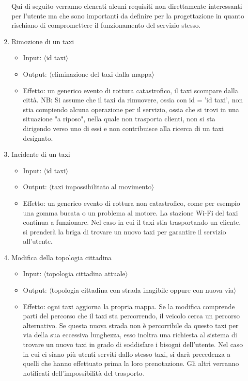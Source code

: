 \begin{enumerate}
	Qui di seguito verranno elencati alcuni requisiti non direttamente interessanti per l'utente ma che sono importanti da definire per la progettazione in quanto rischiano di compromettere il funzionamento del servizio stesso.
	
	\item Rimozione di un taxi
		\begin{itemize}
			\item Input: $\langle$id taxi$\rangle$
			\item Output: $\langle$eliminazione del taxi dalla mappa$\rangle$
			\item Effetto: un generico evento di rottura catastrofico, il taxi scompare dalla città. NB: Si assume che il taxi da rimuovere, ossia con id = 'id taxi', non stia compiendo alcuna operazione per il servizio, ossia che si trovi in una situazione "a riposo", nella quale non trasporta clienti, non si sta dirigendo verso uno di essi e non contribuisce alla ricerca di un taxi designato.
		\end{itemize}
	
	\item Incidente di un taxi
	\begin{itemize}
		\item Input: $\langle$id taxi$\rangle$
		\item Output: $\langle$taxi impossibilitato al movimento$\rangle$
		\item Effetto: un generico evento di rottura non catastrofico, come per esempio una gomma bucata o un problema al motore. La stazione Wi-Fi del taxi continua a funzionare. Nel caso in cui il taxi stia trasportando un cliente, si prenderà la briga di trovare un nuovo taxi per garantire il servizio all'utente.
	\end{itemize}

	\item Modifica della topologia cittadina
		\begin{itemize}
			\item Input: $\langle$topologia cittadina attuale$\rangle$
			\item Output: $\langle$topologia cittadina con strada inagibile oppure con nuova via$\rangle$
			\item Effetto: ogni taxi aggiorna la propria mappa. Se la modifica comprende parti del percorso che il taxi sta percorrendo, il veicolo cerca un percorso alternativo. Se questa nuova strada non è percorribile da questo taxi per via della sua eccessiva lunghezza, esso inoltra una richiesta al sistema di trovare un nuovo taxi in grado di soddisfare i bisogni dell'utente. Nel caso in cui ci siano più utenti serviti dallo stesso taxi, si darà precedenza a quelli che hanno effettuato prima la loro prenotazione. Gli altri verranno notificati dell'impossibilità del trasporto.
		\end{itemize}

\end{enumerate}

